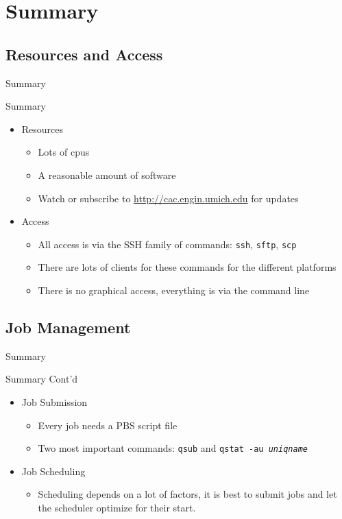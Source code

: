 \documentclass[handout]{beamer}
\begin{document}
\section{Summary}
\subsection{Resources and Access}
\begin{frame}{Summary}
 \begin{block}{Summary}
 \begin{itemize}
  \item Resources
   \begin{itemize}
    \item Lots of cpus
    \item A reasonable amount of software
    \item Watch or subscribe to \url{http://cac.engin.umich.edu} for updates
   \end{itemize}
   \item Access
    \begin{itemize}
     \item All access is via the SSH family of commands: \texttt{ssh},
\texttt{sftp}, \texttt{scp}
     \item There are lots of clients for these commands for the different
platforms
     \item There is no graphical access, everything is via the command line
    \end{itemize}
 \end{itemize}
 \end{block}
\end{frame}
\subsection{Job Management}
\begin{frame}{Summary}
 \begin{block}{Summary Cont'd}
 \begin{itemize}
   \item Job Submission
     \begin{itemize}
     \item Every job needs a PBS script file
     \item Two most important commands: \texttt{qsub} and \texttt{qstat -au \textit{uniqname}}
     \end{itemize}
   \item Job Scheduling
     \begin{itemize}
     \item Scheduling depends on a lot of factors, it is best to submit jobs and let the
scheduler optimize for their start.
     \end{itemize}
 \end{itemize}
 \end{block}
\end{frame}
\end{document}
